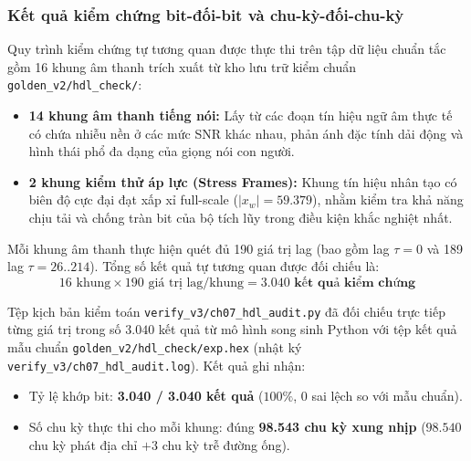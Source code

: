 \subsubsection*{Kết quả kiểm chứng bit-đối-bit và chu-kỳ-đối-chu-kỳ}
Quy trình kiểm chứng tự tương quan được thực thi trên tập dữ liệu chuẩn tắc gồm 16 khung âm thanh trích xuất từ kho lưu trữ kiểm chuẩn \texttt{golden\_v2/hdl\_check/}:
\begin{itemize}[leftmargin=1.5em, itemsep=2pt]
    \item \textbf{14 khung âm thanh tiếng nói:} Lấy từ các đoạn tín hiệu ngữ âm thực tế có chứa nhiễu nền ở các mức SNR khác nhau, phản ánh đặc tính dải động và hình thái phổ đa dạng của giọng nói con người.
    \item \textbf{2 khung kiểm thử áp lực (Stress Frames):} Khung tín hiệu nhân tạo có biên độ cực đại đạt xấp xỉ full-scale ($|x_w| = 59.379$), nhằm kiểm tra khả năng chịu tải và chống tràn bit của bộ tích lũy trong điều kiện khắc nghiệt nhất.
\end{itemize}

Mỗi khung âm thanh thực hiện quét đủ 190 giá trị lag (bao gồm lag $\tau = 0$ và 189 lag $\tau = 26..214$). Tổng số kết quả tự tương quan được đối chiếu là:
\begin{equation}
16\text{ khung} \times 190\text{ giá trị lag/khung} = \mathbf{3.040\text{ kết quả kiểm chứng}}
\end{equation}

Tệp kịch bản kiểm toán \texttt{verify\_v3/ch07\_hdl\_audit.py} đã đối chiếu trực tiếp từng giá trị trong số $3.040$ kết quả từ mô hình song sinh Python với tệp kết quả mẫu chuẩn \texttt{golden\_v2/hdl\_check/exp.hex} (nhật ký \texttt{verify\_v3/ch07\_hdl\_audit.log}). Kết quả ghi nhận:
\begin{itemize}[leftmargin=1.5em, itemsep=2pt]
    \item Tỷ lệ khớp bit: \textbf{3.040 / 3.040 kết quả} ($100\%$, 0 sai lệch so với mẫu chuẩn).
    \item Số chu kỳ thực thi cho mỗi khung: đúng \textbf{98.543 chu kỳ xung nhịp} ($98.540$ chu kỳ phát địa chỉ $+ 3$ chu kỳ trễ đường ống).
\end{itemize}

